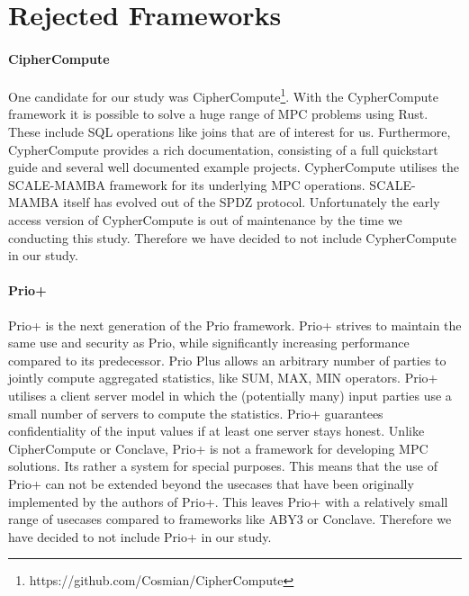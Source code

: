 \section{Rejected Frameworks}
\paragraph{CipherCompute}
One candidate for our study was CipherCompute\footnote{https://github.com/Cosmian/CipherCompute}. With the CypherCompute framework it is possible to solve a huge range of MPC problems using Rust. These include SQL operations like joins that are of interest for us. Furthermore, CypherCompute provides a rich documentation, consisting of a full quickstart guide and several well documented example projects. CypherCompute utilises the SCALE-MAMBA \cite{aly2021scale} framework for its underlying MPC operations. SCALE-MAMBA  itself has evolved out of the SPDZ \cite{SPDZ} protocol. Unfortunately the early access version of CypherCompute is out of maintenance by the time we conducting this study. Therefore we have decided to not include CypherCompute in our study.

\paragraph{Prio+}
Prio+ \cite{cryptoeprint:2021:576} is the next generation of the Prio \cite{201553} framework. Prio+ strives to maintain the same use and security as Prio, while significantly increasing performance compared to its predecessor. Prio Plus allows an arbitrary number of parties to jointly compute aggregated statistics, like SUM, MAX, MIN operators. Prio+ utilises a client server model in which the (potentially many) input parties use a small number of servers to compute the statistics. Prio+ guarantees confidentiality of the input values if at least one server stays honest. Unlike CipherCompute or Conclave, Prio+ is not a framework for developing MPC solutions. Its rather a system for special purposes. This means that the use of Prio+ can not be extended beyond the usecases that have been originally implemented by the authors of Prio+. This leaves Prio+ with a relatively small range of usecases compared to frameworks like ABY3 or Conclave. Therefore we have decided to not include Prio+ in our study.

